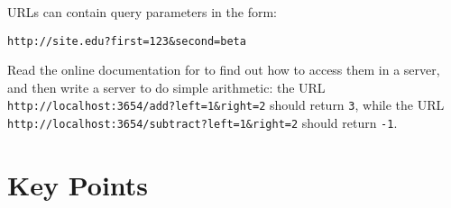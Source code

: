 
URLs can contain query parameters in the form:

\begin{verbatim}
http://site.edu?first=123&second=beta
\end{verbatim}

\noindent
Read the online documentation for  to find out
how to access them in a server,
and then write a server to do simple arithmetic:
the URL \texttt{http://localhost:3654/add?left=1\&right=2} should return \texttt{3},
while the URL \texttt{http://localhost:3654/subtract?left=1\&right=2} should return \texttt{-1}.

\section*{Key Points}


